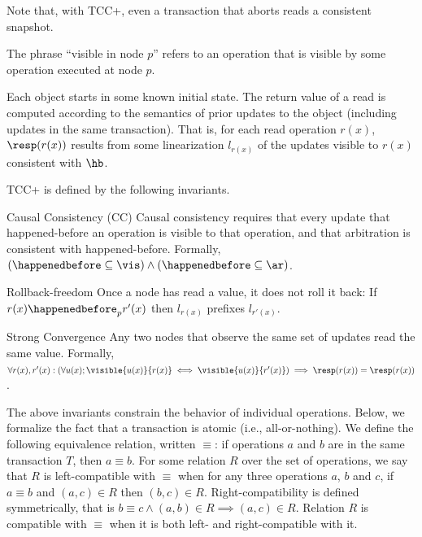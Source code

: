 Note that, with TCC+, even a transaction that aborts reads a
consistent snapshot.


The phrase ``visible in node $p$'' refers to an operation
that is visible by some operation executed at node $p$.

Each object starts in some known initial state.
The return value of a read is computed according to the semantics of
prior updates to the object (including updates in the same transaction).
That is, for each read operation $r(x)$, $\resp(r(x))$ results from some
linearization $l_{r(x)}$ of the updates visible to $r(x)$ consistent
with $\hb$.

TCC+ is defined by the following invariants.
\begin{inv}{Causal Consistency (CC)}
  Causal consistency requires that every update that happened-before an
  operation is visible to that operation, and that
  arbitration is consistent with happened-before.
  Formally, $(\happenedbefore \subseteq \vis) \land (\happenedbefore \subseteq \ar)$.
\end{inv}

\begin{inv}{Rollback-freedom}
  Once a node has read a value, it does not roll it back:
  If $r(x) \happenedbefore_{p} r'(x)$ then $l_{r(x)}$ prefixes $l_{r'(x)}$.
\end{inv}

\begin{inv}{Strong Convergence}
  Any two nodes that observe the same set of updates read the same value.
  Formally,
  $\forall r(x),r'(x):
  (\forall u(x); \visible{u(x)}{r(x)} \iff \visible{u(x)}{r'(x)})
  \implies \resp(r(x)) = \resp(r(x))$.
\end{inv}

The above invariants constrain the behavior of individual operations.
Below, we formalize the fact that a transaction is atomic (i.e.,
all-or-nothing).
%
We define the following equivalence relation, written $\equiv$: if
operations $a$ and $b$ are in the same transaction $T$, then $a \equiv b$.
%
For some relation $R$ over the set of operations, we say that $R$ is
left-compatible with $\equiv$ when for any three operations $a$, $b$ and
$c$, if $a \equiv b$ and $(a,c) \in R$ then $(b,c) \in R$.
Right-compatibility is defined symmetrically, that is $b \equiv c \land
(a,b) \in R \implies (a,c) \in R$.
Relation $R$ is compatible with $\equiv$ when it is both left- and
right-compatible with it.

